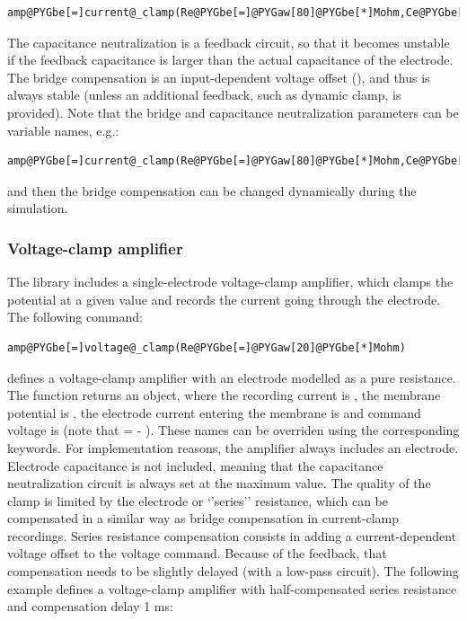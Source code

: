 \documentclass[letterpaper,10pt,english]{manual}
\begin{document}
\begin{Verbatim}[commandchars=@\[\]]
amp@PYGbe[=]current@_clamp(Re@PYGbe[=]@PYGaw[80]@PYGbe[*]Mohm,Ce@PYGbe[=]@PYGaw[10]@PYGbe[*]pF,bridge@PYGbe[=]@PYGaw[78]@PYGbe[*]Mohm,capa@_comp@PYGbe[=]@PYGaw[8]@PYGbe[*]pF)
\end{Verbatim}

The capacitance neutralization is a feedback circuit, so that it becomes unstable if
the feedback capacitance is larger than the actual capacitance of the electrode.
The bridge compensation is an input-dependent voltage offset (), and
thus is always stable (unless an additional feedback, such as dynamic clamp, is provided).
Note that the bridge and capacitance neutralization parameters can be variable names, e.g.:

\begin{Verbatim}[commandchars=@\[\]]
amp@PYGbe[=]current@_clamp(Re@PYGbe[=]@PYGaw[80]@PYGbe[*]Mohm,Ce@PYGbe[=]@PYGaw[10]@PYGbe[*]pF,bridge@PYGbe[=]@PYGad[']@PYGad[Rbridge]@PYGad['],capa@_comp@PYGbe[=]@PYGaw[8]@PYGbe[*]pF)
\end{Verbatim}

and then the bridge compensation can be changed dynamically during the simulation.


\subsubsection{Voltage-clamp amplifier}

The library includes a single-electrode voltage-clamp amplifier, which
clamps the potential at a given value and records the current going through
the electrode.
The following command:

\begin{Verbatim}[commandchars=@\[\]]
amp@PYGbe[=]voltage@_clamp(Re@PYGbe[=]@PYGaw[20]@PYGbe[*]Mohm)
\end{Verbatim}

defines a voltage-clamp amplifier with an electrode modelled as a pure
resistance.
The function
returns an \hyperlink{brian.Equations}{} object, where
the recording current is , the membrane potential is , the electrode current
entering the membrane is  and command voltage is 
(note that  = - ).
These names can be overriden using the corresponding keywords.
For implementation reasons, the amplifier always includes an electrode.
Electrode capacitance is not included, meaning that
the capacitance neutralization circuit is always set at the maximum value.
The quality of the clamp is limited by the electrode or `'series'' resistance,
which can be compensated in a similar way as bridge compensation in current-clamp
recordings. Series resistance compensation consists in adding a current-dependent
voltage offset to the voltage command. Because of the feedback, that compensation needs
to be slightly delayed (with a low-pass circuit). The following example defines a
voltage-clamp amplifier with half-compensated series resistance and compensation delay
1 ms:
\end{document}
